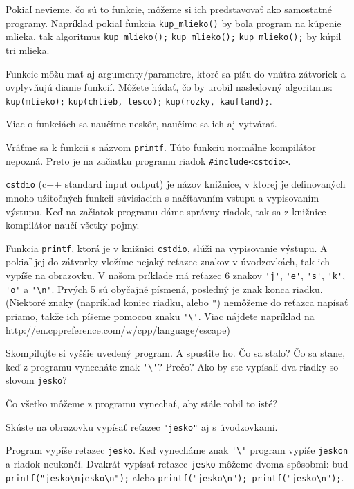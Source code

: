 \medskip

Pokiaľ nevieme, čo sú to funkcie, môžeme si ich predstavovať ako samostatné
programy. Napríklad pokiaľ funkcia \verb!kup_mlieko()! by bola program na
kúpenie mlieka, tak algoritmus \verb!kup_mlieko();! \verb!kup_mlieko();!
\verb!kup_mlieko();! by kúpil tri mlieka.

Funkcie môžu mať aj argumenty/parametre, ktoré sa píšu do vnútra zátvoriek a
ovplyvňujú dianie funkcií. Môžete hádať, čo by urobil nasledovný algoritmus:
\verb!kup(mlieko);! \verb!kup(chlieb, tesco);! \verb!kup(rozky, kaufland);!.

Viac o funkciách sa naučíme neskôr, naučíme sa ich aj vytvárať.

\medskip

Vráťme sa k funkcii s názvom \verb!printf!. Túto funkciu normálne kompilátor
nepozná.  Preto je na začiatku programu riadok \verb!#include<cstdio>!.

\verb!cstdio! (c++ standard input output) je názov knižnice, v ktorej je
definovaných mnoho užitočných funkcií súvisiacich s načítavaním vstupu a
vypisovaním výstupu. Keď na začiatok programu dáme správny riadok, tak sa z
knižnice kompilátor naučí všetky pojmy.

Funkcia \verb!printf!, ktorá je v knižnici \verb!cstdio!, slúži na vypisovanie
výstupu.  A pokiaľ jej do zátvorky vložíme nejaký reťazec znakov v
úvodzovkách, tak ich vypíše na obrazovku.  V našom príklade má reťazec 6 znakov
\verb!'j'!, \verb!'e'!, \verb!'s'!, \verb!'k'!, \verb!'o'! a \verb!'\n'!.
Prvých 5 sú obyčajné písmená, posledný je znak konca riadku. (Niektoré znaky
(napríklad koniec riadku, alebo \verb!"!) nemôžeme do reťazca napísať priamo,
takže ich píšeme pomocou znaku \verb!'\'!. Viac nájdete napríklad na
\url{http://en.cppreference.com/w/cpp/language/escape})

\medskip

\cvicenie Skompilujte si vyššie uvedený program. A spustite ho. Čo sa stalo?
Čo sa stane, keď z programu vynecháte znak \verb!'\'!? Prečo?  Ako by ste
vypísali dva riadky so slovom \verb!jesko!?

\cvicenie Čo všetko môžeme z programu vynechať, aby stále robil to isté?
 
\cvicenie Skúste na obrazovku vypísať reťazec \verb!"jesko"! aj s
úvodzovkami.

\riesenie Program vypíše reťazec \verb"jesko". Keď vynecháme znak \verb!'\'!
program vypíše \verb"jeskon" a riadok neukončí.  Dvakrát vypísať reťazec
\verb"jesko" môžeme dvoma spôsobmi: buď \verb!printf("jesko\njesko\n");! alebo
\verb!printf("jesko\n"); printf("jesko\n");!.

